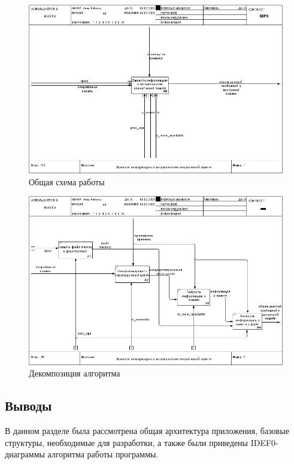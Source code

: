 \begin{figure}[h!]
	\begin{center}
		\includegraphics[scale=0.55]{jpg/01_A-0.png}
	\end{center}
	\captionsetup{justification=centering}
	\caption{Общая схема работы}
	\label{fig:idef_general}
\end{figure}

\begin{figure}[h!]
	\begin{center}
		\includegraphics[scale=0.55]{jpg/02_A0.png}
	\end{center}
	\captionsetup{justification=centering}
	\caption{Декомпозиция алгоритма}
	\label{fig:idef_detailed}
\end{figure}

\newpage

\subsection*{Выводы}

В данном разделе была рассмотрена общая архитектура приложения, базовые структуры, необходимые для разработки, а также были приведены IDEF0-диаграммы алгоритма работы программы.

